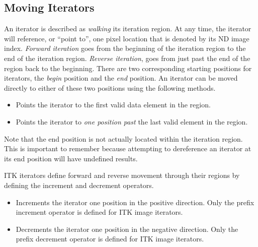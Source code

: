 \subsection{Moving Iterators}
\label{sec:MovingIterators}
An iterator is described as \emph{walking} its iteration region.  At any time,
the iterator will reference, or ``point to'', one pixel location that is
denoted by its ND image index. \emph{Forward iteration} goes from the beginning of the iteration
region to the end of the iteration region.  \emph{Reverse iteration},
goes from just past the end of the region back to the beginning.  There are two
corresponding starting positions for iterators, the \emph{begin} position and
the \emph{end} position.  An iterator can be moved directly to either of these
two positions using the following methods.


\begin{itemize}
\item \textbf{} Points the iterator to the first valid
data element in the region.

\item \textbf{} Points the iterator to \emph{one position past}
the last valid element in the region.
\end{itemize}

Note that the end position is not actually located within the iteration region.  This is
important to remember because attempting to dereference an iterator at its end
position will have undefined results.

ITK iterators define forward and reverse movement through their regions by
defining the increment and decrement operators.

\begin{itemize}
\item \textbf{} Increments the iterator one position in the
positive direction.  Only the prefix increment operator is defined for ITK image
iterators.

\item \textbf{} Decrements the iterator one position in the
negative direction.  Only the prefix decrement operator is defined for ITK
image iterators. 
\end{itemize}

